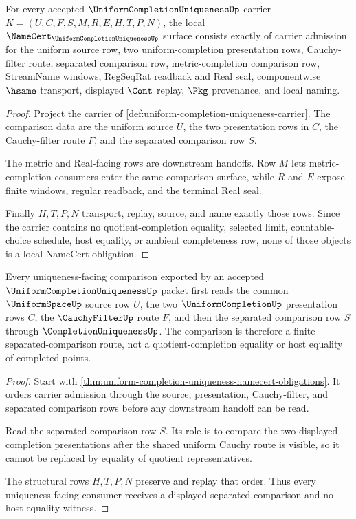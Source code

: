 \begin{theorem}
\label{thm:uniform-completion-uniqueness-namecert-obligations}
For every accepted $\UniformCompletionUniquenessUp$ carrier $K=(U,C,F,S,M,R,E,H,T,P,N)$, the local $\NameCert_{\UniformCompletionUniquenessUp}$ surface consists exactly of carrier admission for the uniform source row, two uniform-completion presentation rows, Cauchy-filter route, separated comparison row, metric-completion comparison row, StreamName windows, RegSeqRat readback and Real seal, componentwise $\hsame$ transport, displayed $\Cont$ replay, $\Pkg$ provenance, and local naming.
\end{theorem}
\begin{proof}
Project the carrier of \autoref{def:uniform-completion-uniqueness-carrier}. The comparison data are the uniform source $U$, the two presentation rows in $C$, the Cauchy-filter route $F$, and the separated comparison row $S$.

The metric and Real-facing rows are downstream handoffs. Row $M$ lets metric-completion consumers enter the same comparison surface, while $R$ and $E$ expose finite windows, regular readback, and the terminal Real seal.

Finally $H,T,P,N$ transport, replay, source, and name exactly those rows. Since the carrier contains no quotient-completion equality, selected limit, countable-choice schedule, host equality, or ambient completeness row, none of those objects is a local NameCert obligation.
\end{proof}

\begin{theorem}
\label{thm:uniform-completion-uniqueness-separated-comparison}
Every uniqueness-facing comparison exported by an accepted $\UniformCompletionUniquenessUp$ packet first reads the common $\UniformSpaceUp$ source row $U$, the two $\UniformCompletionUp$ presentation rows $C$, the $\CauchyFilterUp$ route $F$, and then the separated comparison row $S$ through $\CompletionUniquenessUp$. The comparison is therefore a finite separated-comparison route, not a quotient-completion equality or host equality of completed points.
\end{theorem}
\begin{proof}
Start with \autoref{thm:uniform-completion-uniqueness-namecert-obligations}. It orders carrier admission through the source, presentation, Cauchy-filter, and separated comparison rows before any downstream handoff can be read.

Read the separated comparison row $S$. Its role is to compare the two displayed completion presentations after the shared uniform Cauchy route is visible, so it cannot be replaced by equality of quotient representatives.

The structural rows $H,T,P,N$ preserve and replay that order. Thus every uniqueness-facing consumer receives a displayed separated comparison and no host equality witness.
\end{proof}

